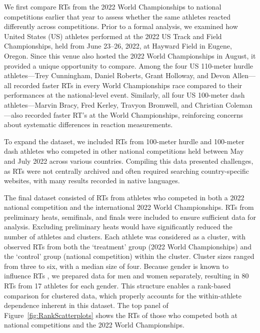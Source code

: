 \documentclass[12pt, letterpaper]{article}
\begin{document}
We first compare RTs from the 2022 World Championships to national
competitions earlier that year to assess whether the same athletes
reacted differently across competitions.
Prior to a formal analysis, we examined how United States (US) athletes
performed at the 2022 US Track and Field Championships, held from June 23--26,
2022, at Hayward Field in Eugene, Oregon. Since this venue also hosted
the 2022 World Championships in August, it
provided a unique opportunity to compare. Among the four US
110-meter hurdle athletes---Trey Cunningham, Daniel Roberts,
Grant Holloway, and Devon Allen---all
recorded faster RTs in every World Championships race
compared to their performances at the national-level event. Similarly,
all four US 100-meter dash athletes---Marvin Bracy, Fred Kerley,
Travyon Bromwell, and Christian Coleman---also recorded faster RT's
at the World Championships, reinforcing concerns 
about systematic differences in reaction measurements.


To expand the dataset, we included RTs from 100-meter hurdle
and 100-meter dash athletes who competed in other national
competitions held between May and July 2022 across various
countries. Compiling this data presented challenges, as RTs were not
centrally archived and often required searching country-specific
websites, with many results recorded in native languages.


The final dataset consisted of RTs from athletes who competed
in both a 2022 national competition and the international 2022 World Championships.
RTs from preliminary heats, semifinals, and finals were included to ensure
sufficient data for analysis. Excluding preliminary heats would have
significantly reduced the number of athletes and clusters. Each
athlete was considered as a cluster, with observed RTs
from both the `treatment' group (2022 World Championships) and
the `control' group (national competition) within the cluster. Cluster
sizes ranged from three to six, with a median size of four. Because gender
is known to influence RTs \citep{babicc2009reaction,
  lipps2011implications}, we prepared data for men and women
separately, resulting in 80 RTs from 17 athletes for each
gender. This structure enables a rank-based comparison for clustered 
data, which properly accounts for the within-athlete dependence inherent 
in this dataset. The top
panel of Figure~\ref{fig:RankScatterplots} shows the RTs
of those who competed both at national competitions and the 2022 World
Championships.
\end{document}
